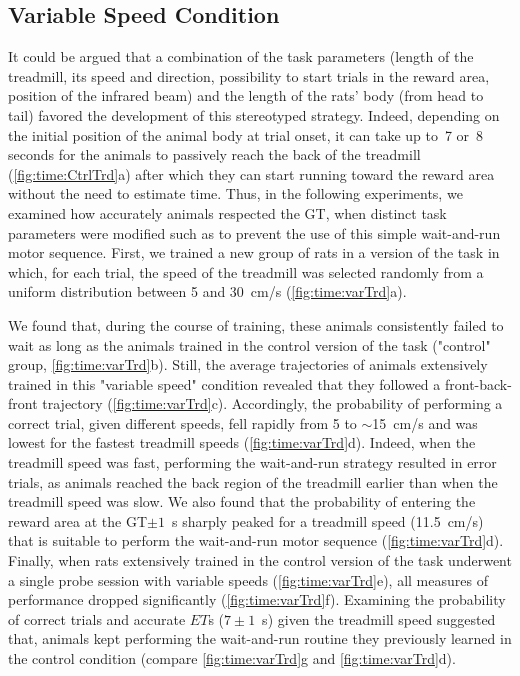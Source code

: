 \subsection{Variable Speed Condition}
\label{ch:time:varSpeed}

It could be argued that a combination of the task parameters (length of the treadmill, its speed and direction, possibility to start trials in the reward area, position of the infrared beam) and the length of the rats' body (from head to tail) favored the development of this stereotyped strategy.
Indeed, depending on the initial position of the animal body at trial onset, it can take up to~7 or~8 seconds for the animals to passively reach the back of the treadmill (\autoref{fig:time:CtrlTrd}a) after which they can start running toward the reward area without the need to estimate time.
Thus, in the following experiments, we examined how accurately animals respected the GT, when distinct task parameters were modified such as to prevent the use of this simple wait-and-run motor sequence.
First, we trained a new group of rats in a version of the task in which, for each trial, the speed of the treadmill was selected randomly from a uniform distribution between 5 and 30~cm/s (\autoref{fig:time:varTrd}a).

We found that, during the course of training, these animals consistently failed to wait as long as the animals trained in the control version of the task ("control" group, \autoref{fig:time:varTrd}b).
Still, the average trajectories of animals extensively trained in this "variable speed" condition revealed that they followed a front-back-front trajectory (\autoref{fig:time:varTrd}c).
Accordingly, the probability of performing a correct trial, given different speeds, fell rapidly from 5 to $\sim$15~cm/s and was lowest for the fastest treadmill speeds (\autoref{fig:time:varTrd}d).
Indeed, when the treadmill speed was fast, performing the wait-and-run strategy resulted in error trials, as animals reached the back region of the treadmill earlier than when the treadmill speed was slow.
We also found that the probability of entering the reward area at the GT$\pm 1$~s sharply peaked for a treadmill speed (11.5~cm/s) that is suitable to perform the wait-and-run motor sequence (\autoref{fig:time:varTrd}d).
Finally, when rats extensively trained in the control version of the task underwent a single probe session with variable speeds (\autoref{fig:time:varTrd}e), all measures of performance dropped significantly (\autoref{fig:time:varTrd}f).
Examining the probability of correct trials and accurate $ET$s ($7\pm 1$~s) given the treadmill speed suggested that, animals kept performing the wait-and-run routine they previously learned in the control condition (compare \autoref{fig:time:varTrd}g and \autoref{fig:time:varTrd}d).

